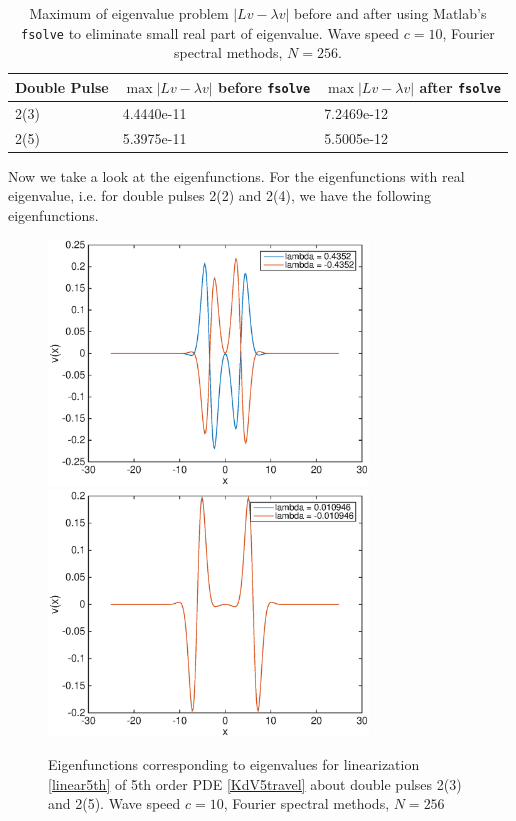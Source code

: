 \documentclass[12pt]{article}
\begin{document}
\begin{table}[H]
\begin{tabular}{l|ll}
 Double Pulse   & $\max{|Lv - \lambda v|}$ before \texttt{fsolve} & $\max{|Lv - \lambda v|}$ after \texttt{fsolve}\\ \hline
  2(3) & 4.4440e-11 & 7.2469e-12 \\
  2(5) & 5.3975e-11 & 5.5005e-12 \\
\end{tabular}
\caption{Maximum of eigenvalue problem $|Lv - \lambda v|$ before and after using Matlab's \texttt{fsolve} to eliminate small real part of eigenvalue. Wave speed $c = 10$, Fourier spectral methods, $N = 256$.}
\end{table}


Now we take a look at the eigenfunctions. For the eigenfunctions with real eigenvalue, i.e. for double pulses 2(2) and 2(4), we have the following eigenfunctions.

\begin{figure}[H]
	\includegraphics[width=8.5cm]{four10dp1eigenfns}
	\includegraphics[width=8.5cm]{four10dp3eigenfns}
	\caption{Eigenfunctions corresponding to eigenvalues for linearization \eqref{linear5th} of 5th order PDE \eqref{KdV5travel} about double pulses 2(3) and 2(5). Wave speed $c = 10$, Fourier spectral methods, $N = 256$}
\end{figure}
\end{document}
